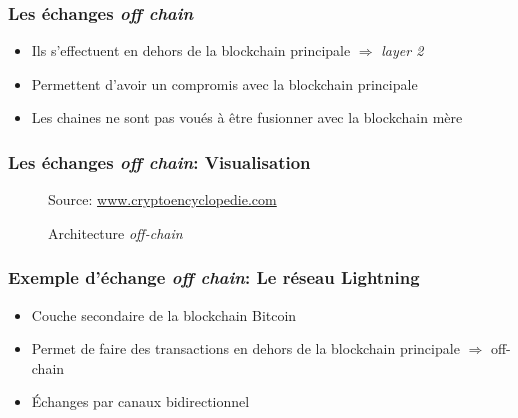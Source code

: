 \begin{frame}
	\frametitle{Les échanges \textit{off chain}}
	\begin{itemize}
		\item Ils s'effectuent en dehors de la blockchain principale $\Rightarrow$ \textit{layer 2}
		\item Permettent d'avoir un compromis avec la blockchain principale
		\item Les chaines ne sont pas voués à être fusionner avec la blockchain mère
	\end{itemize}
\end{frame}

\begin{frame}
	\frametitle{Les échanges \textit{off chain}: Visualisation}
	\begin{figure}[h!]
		\centering
		{\scriptsize Source: \url{www.cryptoencyclopedie.com}}
		\caption{Architecture \textit{off-chain}}
		\label{fig:offchain}
	\end{figure}
\end{frame}


\begin{frame}
	\frametitle{Exemple d'échange \textit{off chain}: Le réseau Lightning}
	\begin{itemize}
		\item Couche secondaire de la blockchain Bitcoin \newline
		\item Permet de faire des transactions en dehors de la blockchain principale $\Rightarrow$ off-chain \newline
		\item Échanges par canaux bidirectionnel
	\end{itemize}
\end{frame}


